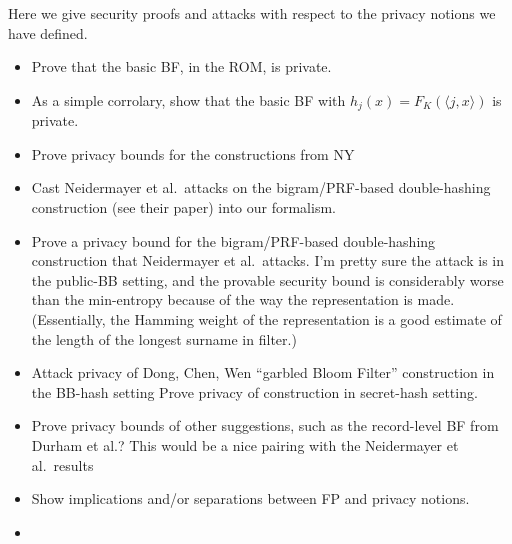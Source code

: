  Here we give security proofs and attacks with respect to the privacy notions we have defined.
\begin{itemize}
\item Prove that the basic BF, in the ROM, is private.  

\item As a simple corrolary, show that the basic BF with $h_j(x)=F_K(\langle j,x \rangle)$ is private.  

\item Prove privacy bounds for the constructions from NY

\item Cast Neidermayer et al.\ attacks on the bigram/PRF-based double-hashing construction (see their paper) into our formalism.   

\item Prove a privacy bound for the bigram/PRF-based double-hashing construction that Neidermayer et al.\ attacks. I'm pretty sure the attack is in the public-BB setting, and the provable security bound is considerably worse than the min-entropy because of the way the representation is made.  (Essentially, the Hamming weight of the representation is a good estimate of the length of the longest surname in filter.)

\item Attack privacy of Dong, Chen, Wen ``garbled Bloom Filter'' construction in the BB-hash setting   Prove privacy of construction in secret-hash setting.  

\item Prove privacy bounds of other suggestions, such as the record-level BF from Durham et al.?  This would be a nice pairing with the Neidermayer et al.\ results

\item Show implications and/or separations between FP and privacy notions.

\item {}
\end{itemize}
